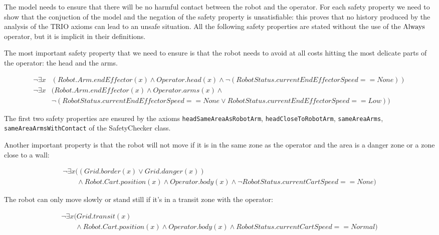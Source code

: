 The model needs to ensure that there will be no harmful contact between the robot and the operator. For each safety property we need to show that the conjuction of the model and the negation of the safety property is unsatisfiable: this proves that no history produced by the analysis of the TRIO axioms can lead to an unsafe situation. All the following safety properties are stated without the use of the $\operatorname{Always}$ operator, but it is implicit in their definitions.

The most important safety property that we need to ensure is that the robot needs to avoid at all costs hitting the most delicate parts of the operator: the head and the arms.

\begin{align*}
\neg \exists x &(Robot.Arm.endEffector(x) \land Operator.head(x) \land \neg (RobotStatus.currentEndEffectorSpeed == None)) \\
\neg \exists x &(Robot.Arm.endEffector(x) \land Operator.arms(x) \land \\
&\neg (RobotStatus.currentEndEffectorSpeed == None \lor RobotStatus.currentEndEffectorSpeed == Low)) 
\end{align*}

The first two safety properties are ensured by the axioms \texttt{headSameAreaAsRobotArm}, \texttt{headCloseToRobotArm}, \texttt{sameAreaArms}, \texttt{sameAreaArmsWithContact} of the SafetyChecker class.

Another important property is that the robot will not move if it is in the same zone as the operator and the area is a danger zone or a zone close to a wall:

\begin{equation*}
  \begin{array}{l}
  \neg \exists x ((Grid.border(x) \lor Grid.danger(x)) \\
  \qquad \land Robot.Cart.position(x) \land Operator.body(x) \land \neg RobotStatus.currentCartSpeed == None)
  \end{array}
\end{equation*}

The robot can only move slowly or stand still if it's in a transit zone with the operator:

\begin{equation*}
  \begin{array}{l}
  \neg \exists x (Grid.transit(x) \\
  \qquad \land Robot.Cart.position(x) \land Operator.body(x) \land RobotStatus.currentCartSpeed == Normal)
  \end{array}
\end{equation*}

